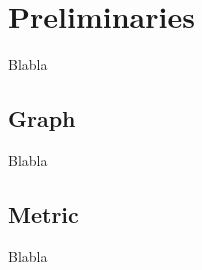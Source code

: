 \section{Preliminaries}\label{preliminaries}
	Blabla

\subsection{Graph}
	Blabla

\subsection{Metric}
	Blabla